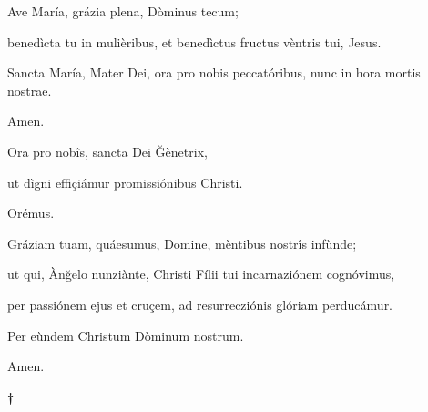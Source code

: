 \documentclass[twoside,10pt]{article}
\begin{document}
{  \noindent Ave María, grázia plena, Dòminus tecum;
  
  benedìcta tu in mulièribus, et benedìctus fructus vèntris tui, Jesus.

  Sancta María, Mater Dei, ora pro nobis peccatóribus, nunc in hora mortis nostrae.

  Amen.

  \bigskip

   Ora pro nobîs, sancta Dei Ğènetrix,

  \smallskip

   ut dìgni effiçiámur promissiónibus Christi.

  \bigskip

   Orémus.

  \bigskip

  \noindent Gráziam tuam, quáesumus, Domine, mèntibus nostrîs infùnde;

  ut qui, Ànğelo nunziànte, Christi Fílii tui incarnaziónem cognóvimus,

  per passiónem ejus et cruçem, ad resurrecziónis glóriam perducámur.

  Per eùndem Christum Dòminum nostrum.

  \bigskip

   Amen.

  \bigskip
  \medskip

  \begin{center}
  {\bfseries\large †}
  \end{center}

}
\end{document}
